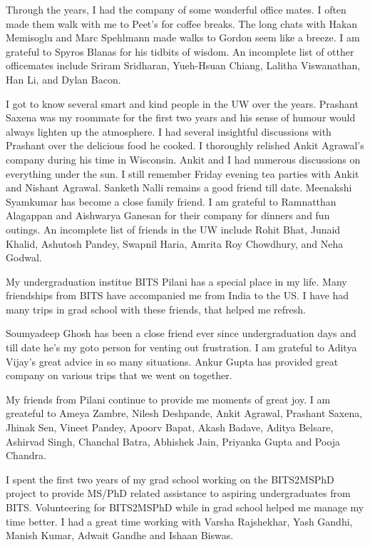 Through the years, I had the company of some wonderful office mates. 
I often made them walk with me to Peet's for coffee breaks.
The long chats with Hakan Memisoglu and Marc Spehlmann made walks to Gordon seem like a breeze.
I am grateful to Spyros Blanas for his tidbits of wisdom. 
An incomplete list of otther officemates include Sriram Sridharan, Yueh-Hsuan Chiang, Lalitha Viswanathan, Han Li, and Dylan Bacon.

I got to know several smart and kind people in the UW over the years. 
Prashant Saxena was my roommate for the first two years and his sense of humour would always lighten up the atmosphere. 
I had several insightful discussions with Prashant over the delicious food he cooked. 
I thoroughly relished Ankit Agrawal's company during his time in Wisconsin.
Ankit and I had numerous discussions on everything under the sun.
I still remember Friday evening tea parties with Ankit and Nishant Agrawal. 
Sanketh Nalli remains a good friend till date.
Meenakshi Syamkumar has become a close family friend. 
I am grateful to Ramnatthan Alagappan and Aishwarya Ganesan for their company for dinners and fun outings.
An incomplete list of friends in the UW include Rohit Bhat, Junaid Khalid, Ashutosh Pandey, Swapnil Haria, Amrita Roy Chowdhury, and Neha Godwal. 

My undergraduation institue BITS Pilani has a special place in my life.
Many friendships from BITS have accompanied me from India to the US. 
I have had many trips in grad school with these friends, that helped me refresh.

Soumyadeep Ghosh has been a close friend ever since undergraduation days and till date he's my goto person for venting out frustration. 
I am grateful to Aditya Vijay's great advice in so many situations.
Ankur Gupta has provided great company on various trips that we went on together.

My friends from Pilani continue to provide me moments of great joy.
I am greateful to Ameya Zambre, Nilesh Deshpande, Ankit Agrawal, Prashant Saxena, Jhinak Sen, Vineet Pandey, Apoorv Bapat, Akash Badave, Aditya Belsare, Ashirvad Singh, Chanchal Batra, Abhishek Jain, Priyanka Gupta and Pooja Chandra.

I spent the first two years of my grad school working on the BITS2MSPhD project to provide MS/PhD related assistance to aspiring undergraduates from BITS. 
Volunteering for BITS2MSPhD while in grad school helped me manage my time better.
I had a great time working with Varsha Rajshekhar, Yash Gandhi, Manish Kumar, Adwait Gandhe and Ishaan Biswas. 

